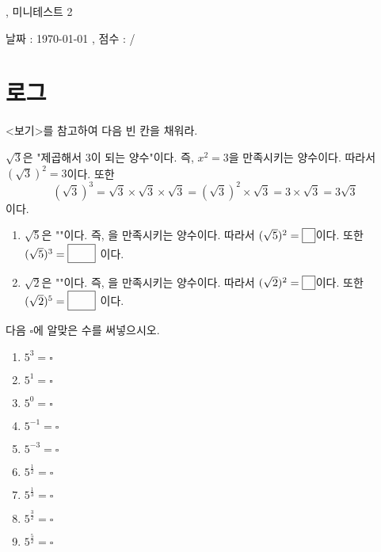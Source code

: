 \documentclass[a4paper]{oblivoir}
\begin{document}
\begin{center}
, 미니테스트 2
\end{center}
\begin{center}
날짜 : \today
,\qquad
점수 :  / 
\end{center}

\section{로그}

%
\prob
<보기>를 참고하여 다음 빈 칸을 채워라.
\begin{mdframed}[frametitle=<보기>]
\(\sqrt3\)은 "제곱해서 3이 되는 양수"이다.
즉, \(x^2=3\)을 만족시키는 양수이다.
따라서 \((\sqrt3)^2=3\)이다.
또한
\[(\sqrt3)^3=\sqrt3\times\sqrt3\times\sqrt3=(\sqrt3)^2\times\sqrt3=3\times\sqrt3=3\sqrt3\]
이다.
\end{mdframed}
\begin{enumerate}[(1)]
\item
\(\sqrt5\)은 ""이다.
즉, 을 만족시키는 양수이다.
따라서 \((\sqrt5)^2=\pb{5}\)이다.
또한
\((\sqrt5)^3=\pb{$5\sqrt5$}\)
이다.
\item
\(\sqrt2\)은 ""이다.
즉, 을 만족시키는 양수이다.
따라서 \((\sqrt2)^2=\pb{2}\)이다.
또한
\((\sqrt2)^5=\pb{$4\sqrt2$}\)
이다.
\end{enumerate}

%
\prob
다음 \(\square\)에 알맞은 수를 써넣으시오.
\\[-10pt]
\begin{enumerate}[(1)]
\item
\(5^3=\square\)
\item
\(5^1=\square\)
\item
\(5^0=\square\)
\item
\(5^{-1}=\square\)
\item
\(5^{-3}=\square\)
\item
\(5^{\frac12}=\square\)
\item
\(5^{\frac13}=\square\)
\item
\(5^{\frac32}=\square\)
\item
\(5^{\frac52}=\square\)
\end{enumerate}
\end{document}
